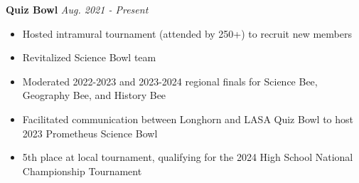 \documentclass{article}
\begin{document}
\begin{flushleft}
    \textbf{Quiz Bowl} \hfill \textsl{Aug. 2021 - Present}
    \begin{itemize}
        \setlength\itemsep{-0.2em}
        \item Hosted intramural tournament (attended by 250+) to recruit new members
        \item Revitalized Science Bowl team
        \item Moderated 2022-2023 and 2023-2024 regional finals for Science Bee, Geography Bee, and History Bee
        \item Facilitated communication between Longhorn and LASA Quiz Bowl to host 2023 Prometheus Science Bowl
        \item 5th place at local tournament, qualifying for the 2024 High School National Championship Tournament
    \end{itemize}


\end{flushleft}
\end{document}
